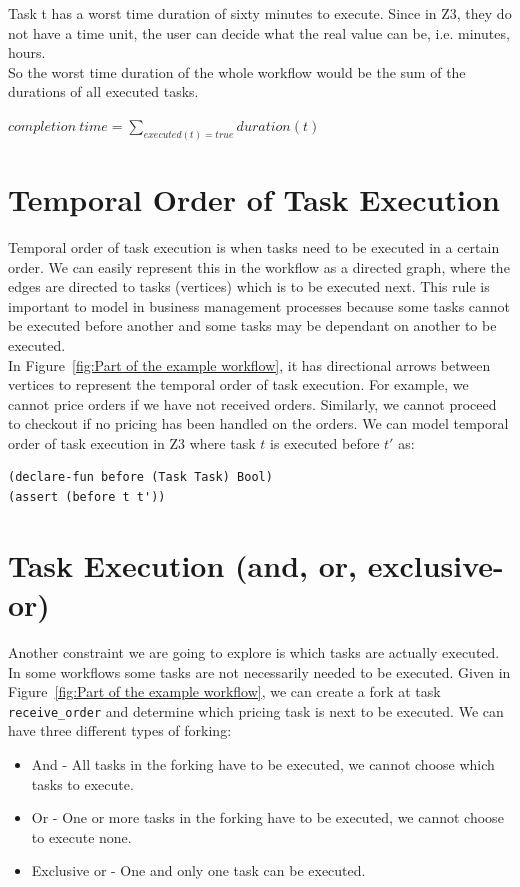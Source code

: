 \documentclass[a4paper]{report}
\begin{document}
Task t has a worst time duration of sixty minutes to execute. Since in Z3, they do not have a time unit, the user can decide what the real value can be, i.e. minutes, hours.\\

So the worst time duration of the whole workflow would be the sum of the durations of all executed tasks.
\begin{center}
$completion\ time = \sum\nolimits_{executed(t) = true} duration(t)$
\end{center}

\newpage

\section{Temporal Order of Task Execution}
Temporal order of task execution is when tasks need to be executed in a certain order. We can easily represent this in the workflow as a directed graph, where the edges are directed to tasks (vertices) which is to be executed next. This rule is important to model in business management processes because some tasks cannot be executed before another and some tasks may be dependant on another to be executed. \\

In Figure~\ref{fig:Part of the example workflow}, it has directional arrows between vertices to represent the temporal order of task execution. For example, we cannot price orders if we have not received orders. Similarly, we cannot proceed to checkout if no pricing has been handled on the orders. We can model temporal order of task execution in Z3 where task $t$ is executed before $t\ensuremath{'}$ as:
\begin{lstlisting}[frame=single]
(declare-fun before (Task Task) Bool)
(assert (before t t'))
\end{lstlisting}

\section{Task Execution (and, or, exclusive-or)}
Another constraint we are going to explore is which tasks are actually executed. In some workflows some tasks are not necessarily needed to be executed. Given in Figure~\ref{fig:Part of the example workflow}, we can create a fork at task \texttt{receive\_order} and determine which pricing task is next to be executed. We can have three different types of forking:
\begin{itemize}
\item And - All tasks in the forking have to be executed, we cannot choose which tasks to execute.
\item Or - One or more tasks in the forking have to be executed, we cannot choose to execute none.
\item Exclusive or - One and only one task can be executed.
\end{itemize}
\end{document}
